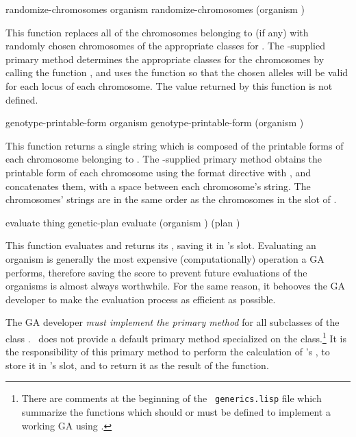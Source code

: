 {\filbreak
{\samepage
\Defgeneric randomize-chromosomes {organism}
 randomize-chromosomes {(organism )}

This function replaces all of the chromosomes belonging to  (if any)
with randomly chosen chromosomes of the appropriate classes for . The
\geco-supplied primary method determines the appropriate classes for the chromosomes
by calling the function , and uses the
 function so that the chosen alleles will be valid
for each locus of each chromosome.
The value returned by this function is not defined.
\par}%

\filbreak
{\samepage
\Defgeneric genotype-printable-form {organism}
 genotype-printable-form {(organism )}

This function returns a single string which is composed of the printable forms of
each chromosome belonging to . The \geco-supplied primary method
obtains the printable form of each chromosome using the  format directive
with , and concatenates them, with a space between each chromosome's
string. The chromosomes' strings are in the same order as the chromosomes in the
 slot of .
\par}%

\filbreak
{\samepage
\Defgeneric evaluate {thing genetic-plan}
 evaluate {(organism ) (plan )}
	\label{evaluate:organism}

This function evaluates  and returns its , saving it in
's  slot. Evaluating an organism is generally the most
expensive (computationally) operation a GA performs, therefore saving the
score to prevent future evaluations of the organisms is almost always
worthwhile. For the same reason, it behooves the GA developer to make the evaluation
process as efficient as possible.
\par}%

\filbreak
The GA developer {\em must implement the primary method} for all subclasses of the
class . \Geco\ does not provide a default primary method specialized on
the  class.\footnote{There are comments at the beginning of the {\tt
generics.lisp} file which summarize the functions which should or must be defined to
implement a working GA using \geco.} It is the responsibility of this primary method
to perform the calculation of 's , to store it in
's  slot, and to return it as the result of the
function.

}
